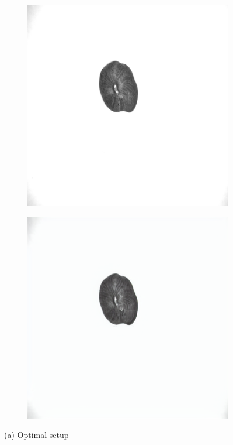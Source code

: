 \documentclass[12pt,DIV14,BCOR12mm,a4paper,footinclude=false,headinclude,parskip=half-,twoside,openright,cleardoublepage=empty,toc=index,bibliography=totoc,listof=totoc]{scrreprt}
\numberwithin{equation}{chapter}
\begin{document}
\begin{figure}
    \centering

    \begin{subfigure}[t]{0.45\textwidth}
        \centering
        \includegraphics[width=\textwidth]{../media/diff_nuts_optimal_real.png}
    \end{subfigure}%
    \hspace{0.02\textwidth}%
    \begin{subfigure}[t]{0.45\textwidth}
        \centering
        \includegraphics[width=\textwidth]{../media/diff_nuts_optimal_fake.png}
    \end{subfigure}
    \caption*{(a) Optimal setup}


\end{figure}
\end{document}

